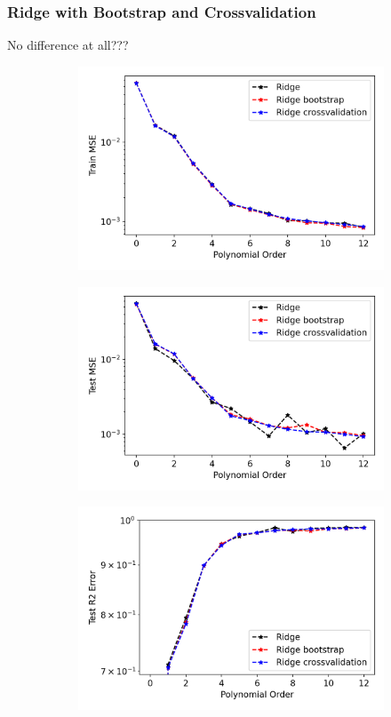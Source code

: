 \subsubsection{Ridge with Bootstrap and Crossvalidation}
No difference at all???

\begin{figure}
\centering
\begin{subfigure}{.5\textwidth}
  \centering
  \includegraphics[width=.9\linewidth]{Images/ridge9.png}
  \caption{}
  \label{fig:ridge9}
\end{subfigure}%
\begin{subfigure}{.5\textwidth}
  \centering
  \includegraphics[width=.9\linewidth]{Images/ridge8.png}
  \caption{}
  \label{fig:ridge8}
\end{subfigure}
\begin{subfigure}{.5\textwidth}
  \centering
  \includegraphics[width=.9\linewidth]{Images/ridge10.png}

\end{subfigure}
\end{figure}
